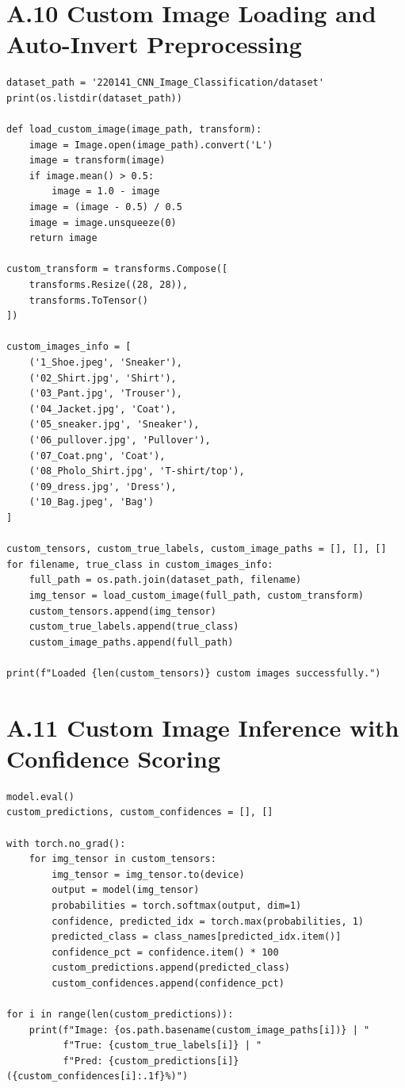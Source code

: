 \documentclass[12pt,a4paper]{report}
\begin{document}
\section*{A.10 Custom Image Loading and Auto-Invert Preprocessing}
\begin{lstlisting}
dataset_path = '220141_CNN_Image_Classification/dataset'
print(os.listdir(dataset_path))

def load_custom_image(image_path, transform):
    image = Image.open(image_path).convert('L')
    image = transform(image)
    if image.mean() > 0.5:
        image = 1.0 - image
    image = (image - 0.5) / 0.5
    image = image.unsqueeze(0)
    return image

custom_transform = transforms.Compose([
    transforms.Resize((28, 28)),
    transforms.ToTensor()
])

custom_images_info = [
    ('1_Shoe.jpeg', 'Sneaker'),
    ('02_Shirt.jpg', 'Shirt'),
    ('03_Pant.jpg', 'Trouser'),
    ('04_Jacket.jpg', 'Coat'),
    ('05_sneaker.jpg', 'Sneaker'),
    ('06_pullover.jpg', 'Pullover'),
    ('07_Coat.png', 'Coat'),
    ('08_Pholo_Shirt.jpg', 'T-shirt/top'),
    ('09_dress.jpg', 'Dress'),
    ('10_Bag.jpeg', 'Bag')
]

custom_tensors, custom_true_labels, custom_image_paths = [], [], []
for filename, true_class in custom_images_info:
    full_path = os.path.join(dataset_path, filename)
    img_tensor = load_custom_image(full_path, custom_transform)
    custom_tensors.append(img_tensor)
    custom_true_labels.append(true_class)
    custom_image_paths.append(full_path)

print(f"Loaded {len(custom_tensors)} custom images successfully.")
\end{lstlisting}

\section*{A.11 Custom Image Inference with Confidence Scoring}
\begin{lstlisting}
model.eval()
custom_predictions, custom_confidences = [], []

with torch.no_grad():
    for img_tensor in custom_tensors:
        img_tensor = img_tensor.to(device)
        output = model(img_tensor)
        probabilities = torch.softmax(output, dim=1)
        confidence, predicted_idx = torch.max(probabilities, 1)
        predicted_class = class_names[predicted_idx.item()]
        confidence_pct = confidence.item() * 100
        custom_predictions.append(predicted_class)
        custom_confidences.append(confidence_pct)

for i in range(len(custom_predictions)):
    print(f"Image: {os.path.basename(custom_image_paths[i])} | "
          f"True: {custom_true_labels[i]} | "
          f"Pred: {custom_predictions[i]} ({custom_confidences[i]:.1f}%)")
\end{lstlisting}
\end{document}
